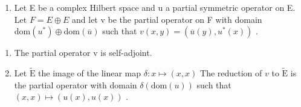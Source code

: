 \begin{enumerate}
\def\labelenumi{\arabic{enumi})}
\setcounter{enumi}{23}
\tightlist
\item
  Let E be a complex Hilbert space and u a partial symmetric operator on E. Let \(F = E \oplus E\) and let v be the partial operator on F with domain \(\text{dom}(u^{*}) \oplus \text{dom}(\overline{u})\) such that \(v(x, y) = (\overline{u}(y), u^{*}(x))\) .
\end{enumerate}

\begin{enumerate}
\def\labelenumi{\alph{enumi})}
\item
  The partial operator v is self-adjoint.
\item
  Let \(\widetilde{\mathrm{E}}\) the image of the linear map \(\delta\colon x\mapsto(x,x)\) The reduction of \(v\) to \(\widetilde{\mathrm{E}}\) is the partial operator with domain \(\delta(\mathrm{dom}(u))\) such that \((x,x)\mapsto(u(x),u(x))\) .
\end{enumerate}

